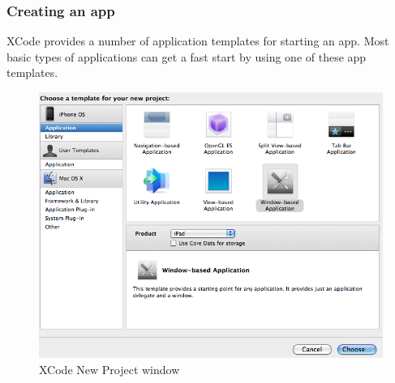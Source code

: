 \documentclass[10pt]{beamer}
\begin{document}
    
\begin{frame}[fragile]
  \frametitle{Creating an app}
  XCode provides a number of application templates for starting an app.  Most basic types of applications can get a fast start by using one of these app templates. \begin{figure}[htb]
  \begin{center}

  \includegraphics[scale=0.35]{ProjectCreator.png}

  \caption{XCode New Project window}
  \end{center}
  \end{figure}

\end{frame}
\end{document}
